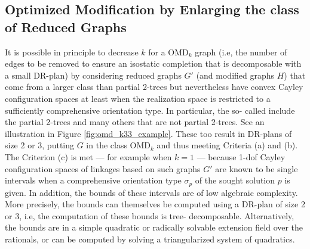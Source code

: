 \subsection{Optimized Modification by Enlarging the class of Reduced
Graphs}
\label{sec:tdecomp}
%
It is possible in principle to decrease $k$ for a OMD$_k$ graph (i.e,
the number of edges to be removed to ensure an isostatic completion
that is decomposable with a small DR-plan) by considering reduced
graphs $G'$ (and modified graphs $H$) that come from a larger class
than partial 2-trees but nevertheless have convex Cayley configuration
spaces at least when the realization space is restricted to a
sufficiently comprehensive orientation type. In particular, the so-
called 
\cite{sitharam2011cayleyI,sitharam2011cayleyII} include the partial 2-trees and many others that are not
partial 2-trees. See an illustration in Figure \ref{fig:omd_k33_example}.
These too result in DR-plans of size 2 or 3, putting
$G$ in the class OMD$_k$ and thus meeting Criteria (a) and (b). The
Criterion (c) is met --- for example when $k=1$ --- because 1-dof Cayley
configuration spaces of linkages based on such graphs $G'$ are known
to be single intervals when a comprehensive orientation type
$\sigma_p$ of the sought solution $p$ is given. In addition, the
bounds of these intervals are of low algebraic complexity. More
precisely, the bounds  can themselves be computed using a DR-plan of
size 2 or 3, i.e, the computation of these bounds is tree-
decomposable. Alternatively, the bounds are in a simple quadratic or
radically solvable extension field over the rationals, or can be
computed by solving a triangularized system of quadratics.
